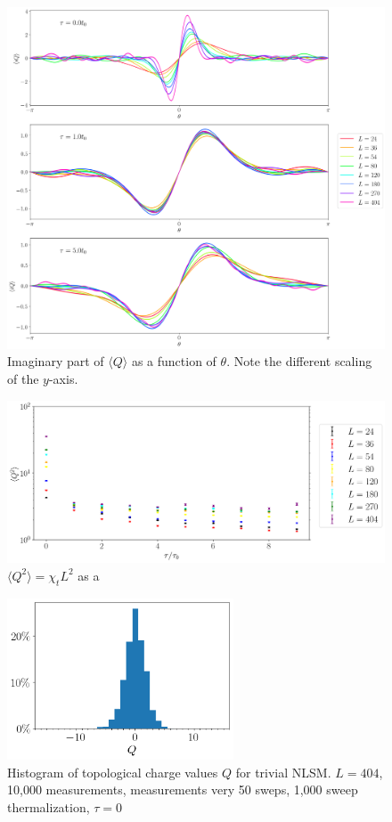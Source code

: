 \documentclass[12pt]{report}
\begin{document}
\begin{figure}[h]
    \centering
      \includegraphics[width=\textwidth]{imgs/theta.png}
      \caption{\label{fig:theta} Imaginary part of $\langle Q \rangle$ as a function of $\theta$. Note the different scaling of the $y$-axis.}
\end{figure}


\begin{figure}[h]
    \centering
      \includegraphics[width=\textwidth]{imgs/bietenholz.png}
      \caption{\label{fig:bietenholz} $\langle Q^2 \rangle=\chi_t L^2$ as a  }
\end{figure}

\begin{figure}[h]
    \centering
      \includegraphics[width=0.6\textwidth]{imgs/hist.png}
      \caption{\label{fig:hist} Histogram of topological charge values $Q$ for trivial NLSM. $L=404$, 10,000 measurements, measurements very 50 sweps, 1,000 sweep thermalization, $\tau=0$}
\end{figure}
\end{document}
